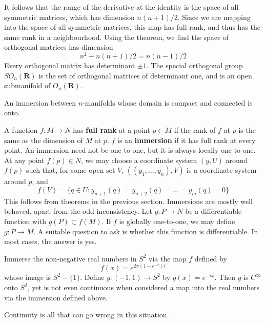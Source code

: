 \begin{example}
    It follows that the range of the derivative at the identity is the space of all symmetric matrices, which has dimension $n(n+1)/2$. Since we are mapping into the space of all symmetric matrices, this map has full rank, and thus has the same rank in a neighbourhood. Using the theorem, we find the space of orthogonal matrices has dimension
    \[ n^2 - n(n+1)/2 = n(n-1)/2 \]
    Every orthogonal matrix has determinant $\pm 1$. The special orthogonal group $SO_n(\mathbf{R})$ is the set of orthogonal matrices of determinant one, and is an open submanifold of $O_n(\mathbf{R})$.
\end{example}

\begin{corollary}
    An immersion between $n$-manifolds whose domain is compact and connected is onto.
\end{corollary}

A function $f:M \to N$ has {\bf full rank} at a point $p \in M$ if the rank of $f$ at $p$ is the same as the dimension of $M$ at $p$. $f$ is an {\bf immersion} if it has full rank at every point. An immersion need not be one-to-one, but it is always locally one-to-one. At any point $f(p) \in N$, we may choose a coordinate system $(y,U)$ around $f(p)$ such that, for some open set $V$, $((y_1, \dots, y_n),V)$ is a coordinate system around $p$, and
%
\[ f(V) = \{ q \in U : y_{n+1}(q) = y_{n+2}(q) = \dots = y_m(q) = 0 \} \]
%
This follows from theorems in the previous section. Immersions are mostly well behaved, apart from the odd inconsistency. Let $g:P \to N$ be a differentiable function with $g(P) \subset f(M)$. If $f$ is globally one-to-one, we may define $g:P \to M$. A suitable question to ask is whether this function is differentiable. In most cases, the answer is yes.

\begin{example}
    Immerse the non-negative real numbers in $S^2$ via the map $f$ defined by
    \[ f(x) = e^{2\pi(1 - e^{-x})i} \]
    whose image is $S^2 - \{ 1 \}$. Define $g:(-1,1) \to S^2$ by $g(x) = e^{-ix}$. Then $g$ is $C^\infty$ onto $S^2$, yet is not even continuous when considered a map into the real numbers via the immersion defined above.
\end{example}

Continuity is all that can go wrong in this situation.


